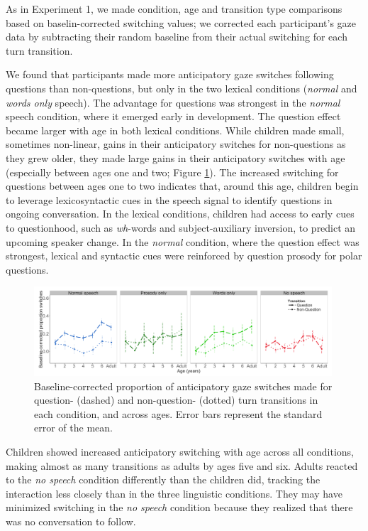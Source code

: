 \documentclass[authoryear, 12pt]{elsarticle}
\begin{document}
As in Experiment 1, we made condition, age and transition type comparisons based on baselin-corrected switching values; we corrected each participant's gaze data by subtracting their random baseline from their actual switching for each turn transition.

We found that participants made more anticipatory gaze switches following questions than non-questions, but only in the two lexical conditions (\textit{normal} and \textit{words only} speech). The advantage for questions was strongest in the \textit{normal} speech condition, where it emerged early in development. The question effect became larger with age in both lexical conditions. While children made small, sometimes non-linear, gains in their anticipatory switches for non-questions as they grew older, they made large gains in their anticipatory switches with age (especially between ages one and two; Figure \ref{fig:questionsEN}). The increased switching for questions between ages one to two indicates that, around this age, children begin to leverage lexicosyntactic cues in the speech signal to identify questions in ongoing conversation. In the lexical conditions, children had access to early cues to questionhood, such as \textit{wh}-words and subject-auxiliary inversion, to predict an upcoming speaker change. In the \textit{normal} condition, where the question effect was strongest, lexical and syntactic cues were reinforced by question prosody for polar questions.

\begin{figure}[t]
\begin{center}
\includegraphics[width=0.99\textwidth]{figures/FIG-QvsNQ-EN.png}
\end{center}
\caption{Baseline-corrected proportion of anticipatory gaze switches made for question- (dashed) and non-question- (dotted) turn transitions in each condition, and across ages. Error bars represent the standard error of the mean.} 
\label{fig:questionsEN}
\end{figure}

Children showed increased anticipatory switching with age across all conditions, making almost as many transitions as adults by ages five and six. Adults reacted to the \textit{no speech} condition differently than the children did, tracking the interaction less closely than in the three linguistic conditions. They may have minimized switching in the \textit{no speech} condition because they realized that there was no conversation to follow.
\end{document}
